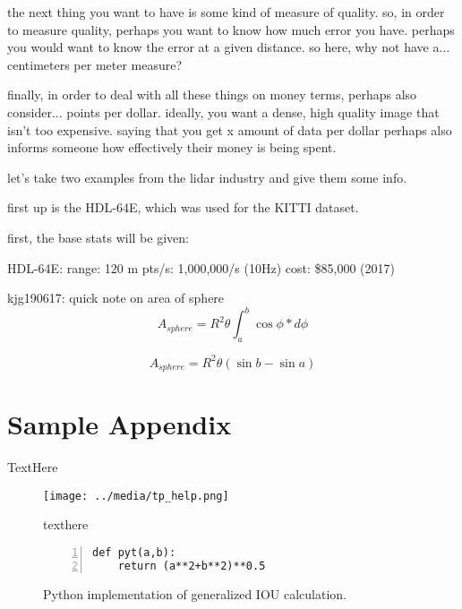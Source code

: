 the next thing you want to have is some kind of measure of quality. so, in order to measure quality, perhaps you want to know how much error you have. perhaps you would want to know the error at a given distance. so here, why not have a... centimeters per meter measure? 

finally, in order to deal with all these things on money terms, perhaps also consider... points per dollar. ideally, you want a dense, high quality image that isn't too expensive. saying that you get x amount of data per dollar perhaps also informs someone how effectively their money is being spent. 

let's take two examples from the lidar industry and give them some info. 

first up is the HDL-64E, which was used for the KITTI dataset. 

first, the base stats will be given: 


HDL-64E:
range: 120 m
pts/s: 1,000,000/s (10Hz)
cost: \$85,000 (2017)














kjg190617: quick note on area of sphere
$$ A_{sphere}=R^2\theta \int_{a}^{b}\cos\phi*d\phi $$

$$ A_{sphere}=R^2\theta (\sin{b} - \sin{a})$$



\newpage
\section{Sample Appendix}
TextHere

\begin{figure}[h] %
    \texttt{[image: ../media/tp\_help.png]}
    \caption{texthere}
    \label{delme_figure} %
\end{figure}


\begin{figure}[h] %
\begin{lstlisting}[numbers=left]
def pyt(a,b):
    return (a**2+b**2)**0.5
\end{lstlisting}
\onehalfspacing %
\caption{Python implementation of generalized IOU calculation.}
\label{delme_code} %
\end{figure}

